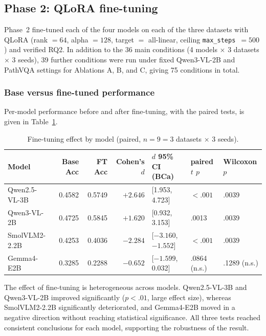 \subsection{Phase 2: QLoRA fine-tuning}
\label{sec:res-phase2}

Phase~2 fine-tuned each of the four models on each of the three datasets with
QLoRA (rank $=64$, alpha $=128$, target $=$ all-linear, ceiling
\texttt{max\_steps}~$=500$) and verified RQ2. In addition to the 36 main
conditions (4 models $\times$ 3 datasets $\times$ 3 seeds), 39 further
conditions were run under fixed Qwen3-VL-2B and PathVQA settings for Ablations A,
B, and C, giving 75 conditions in total.

\subsubsection{Base versus fine-tuned performance}

Per-model performance before and after fine-tuning, with the paired tests, is
given in Table~\ref{tab:phase2ft}.

\begin{table}[t]
\centering
\caption{Fine-tuning effect by model (paired, $n = 9 = 3$ datasets $\times$ 3
seeds).}
\label{tab:phase2ft}
\small
\begin{tabular}{@{}lrrrlll@{}}
\toprule
Model & Base Acc & FT Acc & Cohen's $d$ & $d$ 95\% CI (BCa) & paired $t$ $p$ & Wilcoxon $p$ \\
\midrule
Qwen2.5-VL-3B & 0.4582 & 0.5749 & $+2.646$ & [1.953, 4.723]   & $< .001$ & .0039 \\
Qwen3-VL-2B   & 0.4725 & 0.5845 & $+1.620$ & [0.932, 3.153]   & .0013    & .0039 \\
SmolVLM2-2.2B & 0.4253 & 0.4036 & $-2.284$ & [$-3.160$, $-1.552$] & $< .001$ & .0039 \\
Gemma4-E2B    & 0.3285 & 0.2288 & $-0.652$ & [$-1.599$, 0.032]    & .0864 (n.s.) & .1289 (n.s.) \\
\bottomrule
\end{tabular}
\end{table}

The effect of fine-tuning is heterogeneous across models. Qwen2.5-VL-3B and
Qwen3-VL-2B improved significantly ($p < .01$, large effect size), whereas
SmolVLM2-2.2B significantly deteriorated, and Gemma4-E2B moved in a negative
direction without reaching statistical significance. All three tests reached
consistent conclusions for each model, supporting the robustness of the result.


